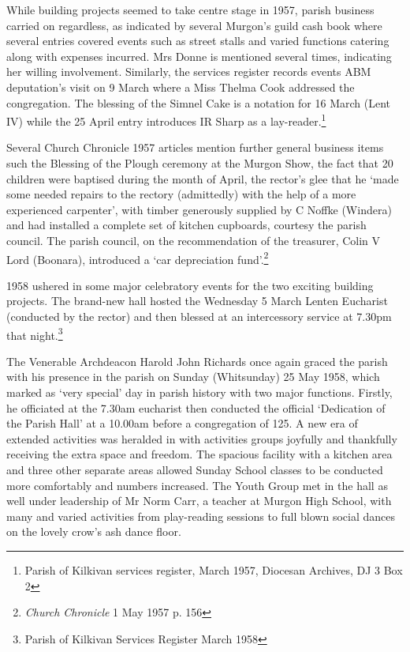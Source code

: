 While building projects seemed to take centre stage in 1957, parish business carried on regardless, as indicated by several Murgon's guild cash book where several entries covered events such as street stalls and varied functions catering along with expenses incurred. Mrs Donne is mentioned several times, indicating her willing involvement. Similarly, the services register records events ABM deputation's visit on 9 March where a Miss Thelma Cook addressed the congregation. The blessing of the Simnel Cake is a notation for 16 March (Lent IV) while the 25 April entry introduces IR Sharp as a lay-reader.\footnote{Parish of Kilkivan services register, March 1957, Diocesan Archives, DJ 3 Box 2}

Several Church Chronicle 1957 articles mention further general business items such the Blessing of the Plough ceremony at the Murgon Show, the fact that 20 children were baptised during the month of April, the rector's glee that he `made some needed repairs to the rectory (admittedly) with the help of a more experienced carpenter', with timber generously supplied by C Noffke (Windera) and had installed a complete set of kitchen cupboards, courtesy the parish council. The parish council, on the recommendation of the treasurer, Colin V Lord (Boonara), introduced a `car depreciation fund'.\footnote{\emph{Church Chronicle} 1 May 1957 p. 156}

1958 ushered in some major celebratory events for the two exciting building projects. The brand-new hall hosted the Wednesday 5 March Lenten Eucharist (conducted by the rector) and then blessed at an intercessory service at 7.30pm that night.\footnote{Parish of Kilkivan Services Register March 1958}

The Venerable Archdeacon Harold John Richards once again graced the parish with his presence in the parish on Sunday (Whitsunday) 25 May 1958, which marked as `very special' day in parish history with two major functions. Firstly, he officiated at the 7.30am eucharist then conducted the official `Dedication of the Parish Hall' at a 10.00am before a congregation of 125. A new era of extended activities was heralded in with activities groups joyfully and thankfully receiving the extra space and freedom. The spacious facility with a kitchen area and three other separate areas allowed Sunday School classes to be conducted more comfortably and numbers increased. The Youth Group met in the hall as well under leadership of Mr Norm Carr, a teacher at Murgon High School, with many and varied activities from play-reading sessions to full blown social dances on the lovely crow's ash dance floor.

